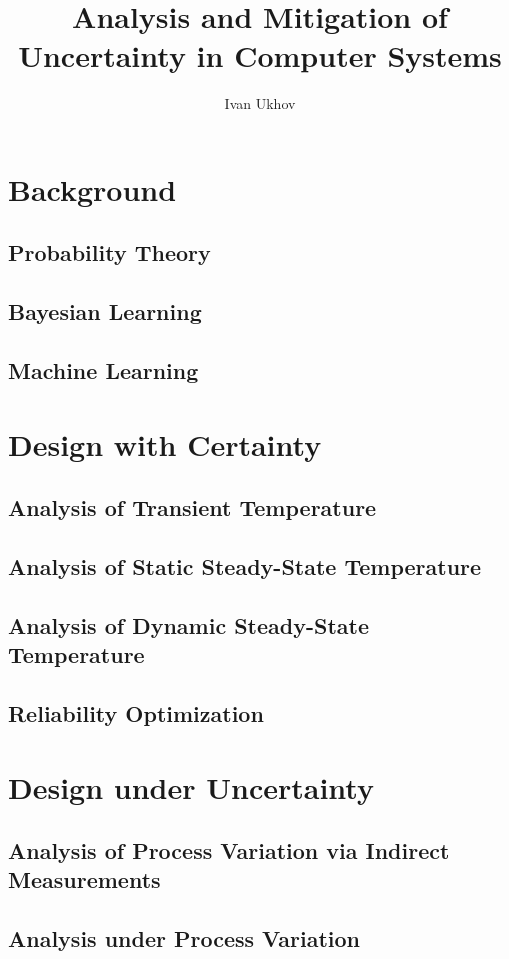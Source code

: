 \documentclass[english]{style}
\title{
  Analysis and Mitigation of\\[0.3em]
  Uncertainty in Computer Systems
}
\author{Ivan Ukhov}
\begin{document}
\nocite{ukhov2017, ukhov2015, ukhov2014a, ukhov2014b, ukhov2012}



\chapter{Background}
\section{Probability Theory}
\section{Bayesian Learning}
\section{Machine Learning}

\chapter{Design with Certainty}
\section{Analysis of Transient Temperature}
\section{Analysis of Static Steady-State Temperature}
\section{Analysis of Dynamic Steady-State Temperature}
\section{Reliability Optimization}

\chapter{Design under Uncertainty}
\section{Analysis of Process Variation via Indirect Measurements}
\section{Analysis under Process Variation}
\end{document}
